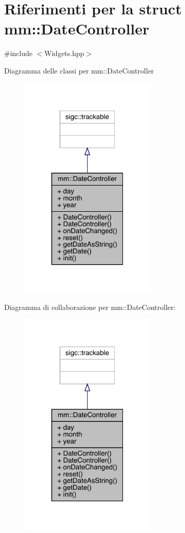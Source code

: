 \hypertarget{structmm_1_1_date_controller}{}\section{Riferimenti per la struct mm\+:\+:Date\+Controller}
\label{structmm_1_1_date_controller}


{\ttfamily \#include $<$Widgets.\+hpp$>$}



Diagramma delle classi per mm\+:\+:Date\+Controller
\nopagebreak
\begin{figure}[H]
\begin{center}
\leavevmode
\includegraphics[width=184pt]{db/db8/structmm_1_1_date_controller__inherit__graph}
\end{center}
\end{figure}


Diagramma di collaborazione per mm\+:\+:Date\+Controller\+:
\nopagebreak
\begin{figure}[H]
\begin{center}
\leavevmode
\includegraphics[width=184pt]{d0/d40/structmm_1_1_date_controller__coll__graph}
\end{center}
\end{figure}
